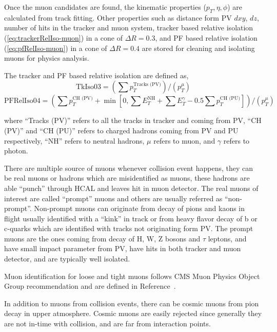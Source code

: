 Once the muon candidates are found,
the kinematic properties (\( p_T, \eta, \phi \))
are calculated from track fitting. Other properties such as distance form
\gls{PV} \( dxy \), \( dz \), number of hits in the tracker and muon system, tracker
based relative isolation (\ref{eq:trackerRelIso-muon}) in a cone of \( \Delta R = 0.3 \), and
\gls{PF} based relative isolation (\ref{eq:pfRelIso-muon})
in a cone of \( \Delta R = 0.4 \) are stored for cleaning and isolating muons for
physics analysis.

The tracker and \gls{PF} based relative isolation are defined as,
%
\begin{equation}\label{eq:trackerRelIso-muon}
  \text{TkIso03} = \left( \sum p_{T}^{\text{Tracks (PV)}} \right) /
  \left( p_{T}^{\mu} \right)
\end{equation}
%
\begin{equation}\label{eq:pfRelIso-muon}
  \text{PFRelIso04} = \left( \sum p_{T}^{\text{CH (PV)}}
  + \min \left[ 0, \sum E_{T}^{\text{NH}} + \sum E_{T}^{\gamma}
    - 0.5 \sum p_{T}^{\text{CH (PU)}} \right] \right) /
  \left( p_{T}^{\mu} \right)
\end{equation}

where ``Tracks (PV)'' refers to all the tracks in tracker and coming from \gls{PV},
``CH (PV)'' and ``CH (PU)'' refers to charged hadrons coming from \gls{PV} and \gls{PU}
respectively, ``NH'' refers to neutral hadrons, \( \mu \) refers to muon, and
\( \gamma \) refers to photon.

There are multiple source of muons whenever collision event happens, they can be
real muons or hadrons which are misidentified as muons, these hadrons
are able ``punch'' through \gls{HCAL} and leaves hit in muon detector. The real
muons of interest are called ``prompt'' muons and others are usually referred
as ``non-prompt''. Non-prompt muons can originate from decay of pions and kaons in flight
usually identified with a ``kink'' in track or from heavy flavor decay of b or c-quarks
which are identified with tracks not originating form \gls{PV}.
The prompt muons are the ones coming from decay of H, W, Z bosons and \( \tau \) leptons,
and have small impact parameter from \gls{PV}, have hits in both tracker
and muon detector, and are typically well isolated.

Muon identification for loose and tight muons
follows \gls{CMS} Muon Physics Object Group
recommendation and are defined in Reference~\cite{cms-muon-id}.

In addition to muons from collision events, there can be cosmic muons from pion decay in
upper atmosphere. Cosmic muons are easily
rejected since generally they are not in-time with collision, and are far from
interaction points.

